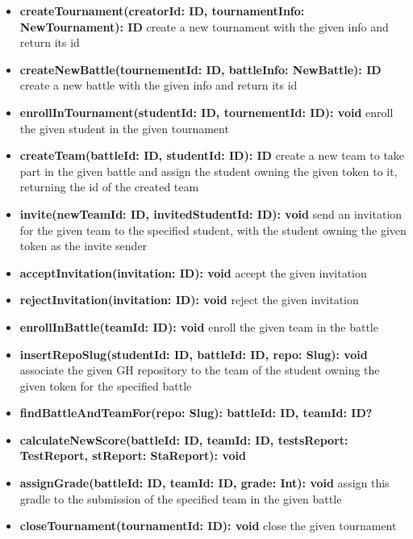 \begin{itemize}
\begin{itemize}
              \item \textbf{createTournament(creatorId: ID, tournamentInfo: NewTournament): ID}
                    create a new tournament with the given info and return its id
              \item \textbf{createNewBattle(tournementId: ID, battleInfo: NewBattle): ID}
                    create a new battle with the given info and return its id
              \item \textbf{enrollInTournament(studentId: ID, tournementId: ID): void}
                    enroll the given student in the given tournament
              \item \textbf{createTeam(battleId: ID, studentId: ID): ID}
                    create a new team to take part in the given battle and assign the student owning the given token
                    to it, returning the id of the created team
              \item \textbf{invite(newTeamId: ID, invitedStudentId: ID): void}
                    send an invitation for the given team to the specified student, with the student owning the given token
                    as the invite sender
              \item \textbf{acceptInvitation(invitation: ID): void}
                    accept the given invitation
              \item \textbf{rejectInvitation(invitation: ID): void}
                    reject the given invitation
              \item \textbf{enrollInBattle(teamId: ID): void}
                    enroll the given team in the battle
              \item \textbf{insertRepoSlug(studentId: ID, battleId: ID, repo: Slug): void }
                    associate the given GH repository to the team of the student owning the given token for the
                    specified battle
              \item \textbf{findBattleAndTeamFor(repo: Slug): {battleId: ID, teamId: ID}? }
              \item \textbf{calculateNewScore(battleId: ID, teamId: ID, testsReport: TestReport, stReport: StaReport): void }
              \item \textbf{assignGrade(battleId: ID, teamId: ID, grade: Int): void }
                    assign this gradle to the submission of the specified team in the given battle
              \item \textbf{closeTournament(tournamentId: ID): void }
                    close the given tournament

\end{itemize}
\end{itemize}
